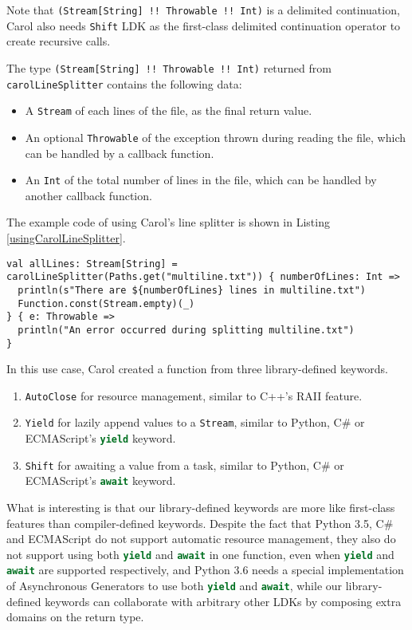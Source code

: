 Note that \lstinline{(Stream[String] !! Throwable !! Int)} is a delimited continuation, Carol also needs \lstinline{Shift} LDK as the first-class delimited continuation operator\cite{danvy1990abstracting,asai2009typing} to create recursive calls.

The type \lstinline{(Stream[String] !! Throwable !! Int)} returned from \lstinline{carolLineSplitter} contains the following data:

\begin{itemize}
  \item A \lstinline{Stream} of each lines of the file, as the final return value.
  \item An optional \lstinline{Throwable} of the exception thrown during reading the file, which can be handled by a callback function.
  \item An \lstinline{Int} of the total number of lines in the file, which can be handled by another callback function.
\end{itemize}

The example code of using Carol's line splitter is shown in Listing \ref{usingCarolLineSplitter}.

\begin{lstlisting}[caption={Using Carol's line splitter},label={usingCarolLineSplitter}]
val allLines: Stream[String] = carolLineSplitter(Paths.get("multiline.txt")) { numberOfLines: Int =>
  println(s"There are ${numberOfLines} lines in multiline.txt")
  Function.const(Stream.empty)(_)
} { e: Throwable =>
  println("An error occurred during splitting multiline.txt")
}
\end{lstlisting}

In this use case, Carol created a function from three library-defined keywords.

\begin{enumerate}
  \item \lstinline{AutoClose} for resource management, similar to C++'s RAII feature.
  \item \lstinline{Yield} for lazily append values to a \lstinline{Stream}, similar to Python, C\# or ECMAScript's \lstinline[language=Python]{yield} keyword.
  \item \lstinline{Shift} for awaiting a value from a task, similar to Python, C\# or ECMAScript's \lstinline[language=Python]{await} keyword.
\end{enumerate}

What is interesting is that our library-defined keywords are more like first-class features than compiler-defined keywords. Despite the fact that Python 3.5, C\# and ECMAScript do not support automatic resource management, they also do not support using both \lstinline[language=Python]{yield} and \lstinline[language=Python]{await} in one function, even when \lstinline[language=Python]{yield} and \lstinline[language=Python]{await} are supported respectively, and Python 3.6 needs a special implementation of Asynchronous Generators \cite{pep525} to use both \lstinline[language=Python]{yield} and \lstinline[language=Python]{await}, while our library-defined keywords can collaborate with arbitrary other LDKs by composing extra domains on the return type.

